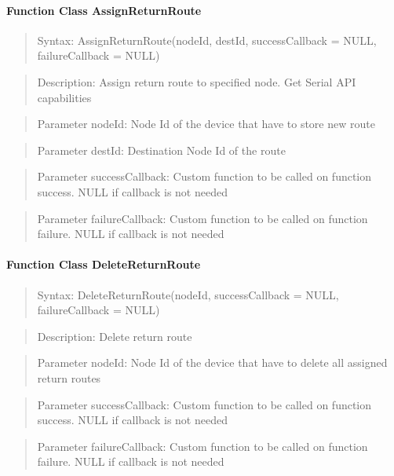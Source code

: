 \paragraph {Function Class AssignReturnRoute}
\begin{quote} Syntax: AssignReturnRoute(nodeId, destId, successCallback = NULL, failureCallback = NULL)\end{quote}
\begin{quote} Description: Assign return route to specified node. Get Serial API capabilities\end{quote}
\begin{quote} Parameter nodeId: Node Id of the device that have to store new route\end{quote}
\begin{quote} Parameter destId: Destination Node Id of the route\end{quote}
\begin{quote} Parameter successCallback: Custom function to be called on function success. NULL if callback is not needed\end{quote} 
\begin{quote} Parameter failureCallback: Custom function to be called on function failure. NULL if callback is not needed\end{quote} 

\paragraph {Function Class DeleteReturnRoute}
\begin{quote} Syntax: DeleteReturnRoute(nodeId, successCallback = NULL, failureCallback = NULL)\end{quote}
\begin{quote} Description: Delete return route\end{quote}
\begin{quote} Parameter nodeId: Node Id of the device that have to delete all assigned return routes\end{quote}
\begin{quote} Parameter successCallback: Custom function to be called on function success. NULL if callback is not needed\end{quote} 
\begin{quote} Parameter failureCallback: Custom function to be called on function failure. NULL if callback is not needed\end{quote} 

